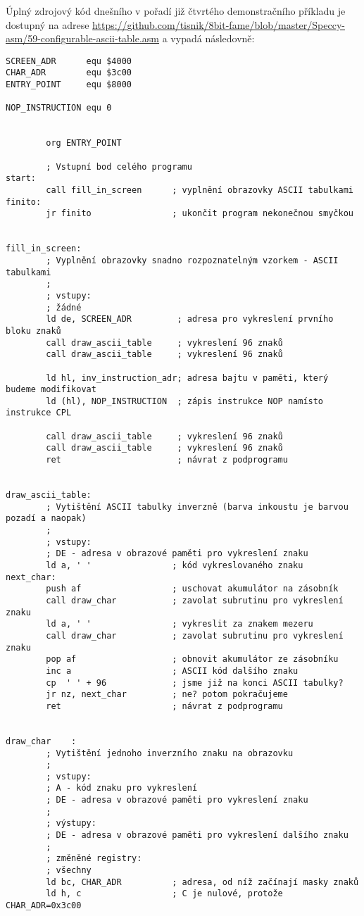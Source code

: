 \documentclass{article}
\begin{document}
Úplný zdrojový kód dnešního v pořadí již čtvrtého demonstračního
příkladu je dostupný na adrese
\url{https://github.com/tisnik/8bit-fame/blob/master/Speccy-asm/59-configurable-ascii-table.asm}
a vypadá následovně:

\begin{verbatim}
SCREEN_ADR      equ $4000
CHAR_ADR        equ $3c00
ENTRY_POINT     equ $8000
 
NOP_INSTRUCTION equ 0
 
 
        org ENTRY_POINT
 
        ; Vstupní bod celého programu
start:
        call fill_in_screen      ; vyplnění obrazovky ASCII tabulkami
finito:
        jr finito                ; ukončit program nekonečnou smyčkou
 
 
fill_in_screen:
        ; Vyplnění obrazovky snadno rozpoznatelným vzorkem - ASCII tabulkami
        ;
        ; vstupy:
        ; žádné
        ld de, SCREEN_ADR         ; adresa pro vykreslení prvního bloku znaků
        call draw_ascii_table     ; vykreslení 96 znaků
        call draw_ascii_table     ; vykreslení 96 znaků
 
        ld hl, inv_instruction_adr; adresa bajtu v paměti, který budeme modifikovat
        ld (hl), NOP_INSTRUCTION  ; zápis instrukce NOP namísto instrukce CPL
 
        call draw_ascii_table     ; vykreslení 96 znaků
        call draw_ascii_table     ; vykreslení 96 znaků
        ret                       ; návrat z podprogramu
 
 
draw_ascii_table:
        ; Vytištění ASCII tabulky inverzně (barva inkoustu je barvou pozadí a naopak)
        ;       
        ; vstupy:
        ; DE - adresa v obrazové paměti pro vykreslení znaku
        ld a, ' '                ; kód vykreslovaného znaku
next_char:
        push af                  ; uschovat akumulátor na zásobník
        call draw_char           ; zavolat subrutinu pro vykreslení znaku
        ld a, ' '                ; vykreslit za znakem mezeru
        call draw_char           ; zavolat subrutinu pro vykreslení znaku
        pop af                   ; obnovit akumulátor ze zásobníku
        inc a                    ; ASCII kód dalšího znaku
        cp  ' ' + 96             ; jsme již na konci ASCII tabulky?
        jr nz, next_char         ; ne? potom pokračujeme
        ret                      ; návrat z podprogramu
 
 
draw_char    :
        ; Vytištění jednoho inverzního znaku na obrazovku
        ;
        ; vstupy:
        ; A - kód znaku pro vykreslení
        ; DE - adresa v obrazové paměti pro vykreslení znaku
        ;
        ; výstupy:
        ; DE - adresa v obrazové paměti pro vykreslení dalšího znaku
        ;
        ; změněné registry:
        ; všechny
        ld bc, CHAR_ADR          ; adresa, od níž začínají masky znaků
        ld h, c                  ; C je nulové, protože CHAR_ADR=0x3c00

\end{verbatim}
\end{document}
